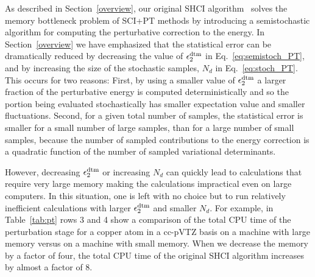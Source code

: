 \documentclass[%
reprint,
 superscriptaddress,
 amsmath,amssymb,
 aps,
]{revtex4-1}
\begin{document}
As described in Section~\ref{overview}, our original SHCI algorithm~\cite{ShaHolJeaAlaUmr-JCTC-17} solves the memory bottleneck problem of SCI+PT methods
by introducing a semistochastic algorithm for computing the perturbative correction to the energy.
In Section~\ref{overview} we have emphasized that the
statistical error can be dramatically reduced
by decreasing the value of $\epsilon_2^{\rm dtm}$ in Eq.~\ref{eq:semistoch_PT}, and by increasing the size of the stochastic samples, $N_d$ in Eq.~\ref{eq:stoch_PT}.
This occurs for two reasons:
First, by using a smaller value of $\epsilon_{2} ^{\rm dtm}$ a larger fraction of the perturbative energy is computed deterministically
and so the portion being evaluated stochastically has smaller expectation value and smaller fluctuations.
Second, for a given total number of samples, the statistical error is smaller for a small number of large samples,
than for a large number of small samples, because the number of sampled contributions to the energy correction is a quadratic function
of the number of sampled variational determinants.

However, decreasing $\epsilon_2^{\rm dtm}$ or increasing $N_d$ can quickly lead to calculations that require very large memory
making the calculations impractical even on large computers. In this situation, one is left with no choice but to run relatively
inefficient calculations with larger $\epsilon_2^{\rm dtm}$ and smaller $N_d$.
For example, in Table~\ref{tab:pt} rows 3 and 4 show a comparison of the total CPU time of the perturbation stage
for a copper atom in a cc-pVTZ basis on a machine with large memory versus on a machine with small memory.
When we decrease the memory by a factor of four, the total CPU time of the original SHCI algorithm increases by almost a factor of 8.
\end{document}
